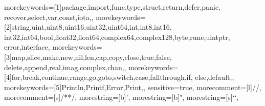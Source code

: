 
%
  {morekeywords=[1]{package,import,func,type,struct,return,defer,panic,%
     recover,select,var,const,iota,},%
   morekeywords=[2]{string,uint,uint8,uint16,uint32,uint64,int,int8,int16,%
     int32,int64,bool,float32,float64,complex64,complex128,byte,rune,uintptr,%
     error,interface},%
   morekeywords=[3]{map,slice,make,new,nil,len,cap,copy,close,true,false,%
     delete,append,real,imag,complex,chan,},%
   morekeywords=[4]{for,break,continue,range,go,goto,switch,case,fallthrough,if,%
     else,default,},%
   morekeywords=[5]{Println,Printf,Error,Print,},%
   sensitive=true,%
   morecomment=[l]{//},%
   morecomment=[s]{/*}{*/},%
   morestring=[b]',%
   morestring=[b]",%
   morestring=[s]{`}{`},%
}

